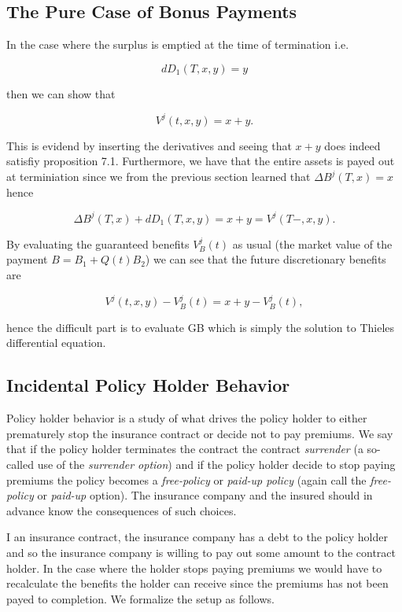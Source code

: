 \documentclass[a4paper,10pt,openany]{book}
\begin{document}
\hypertarget{the-pure-case-of-bonus-payments}{%
\subsection{The Pure Case of Bonus Payments}\label{the-pure-case-of-bonus-payments}}

In the case where the surplus is emptied at the time of termination i.e.

\[
dD_1(T,x,y)=y
\]

then we can show that

\[
V^j(t,x,y)=x+y.
\]

This is evidend by inserting the derivatives and seeing that \(x+y\) does indeed satisfiy proposition 7.1. Furthermore, we have that the entire assets is payed out at terminiation since we from the previous section learned that \(\Delta B^j(T,x)=x\) hence

\[
\Delta B^j(T,x)+dD_1(T,x,y)=x+y=V^j(T-,x,y).
\]

By evaluating the guaranteed benefits \(V_B^j(t)\) as usual (the market value of the payment \(B=B_1+Q(t)B_2\)) we can see that the future discretionary benefits are

\[
V^j(t,x,y)-V^j_B(t)=x+y-V_B^j(t),
\]

hence the difficult part is to evaluate GB which is simply the solution to Thieles differential equation.

\hypertarget{incidental-policy-holder-behavior}{%
\subsection{Incidental Policy Holder Behavior}\label{incidental-policy-holder-behavior}}

Policy holder behavior is a study of what drives the policy holder to either prematurely stop the insurance contract or decide not to pay premiums. We say that if the policy holder terminates the contract the contract \emph{surrender} (a so-called use of the \emph{surrender option}) and if the policy holder decide to stop paying premiums the policy becomes a \emph{free-policy} or \emph{paid-up policy} (again call the \emph{free-policy} or \emph{paid-up} option). The insurance company and the insured should in advance know the consequences of such choices.

I an insurance contract, the insurance company has a debt to the policy holder and so the insurance company is willing to pay out some amount to the contract holder. In the case where the holder stops paying premiums we would have to recalculate the benefits the holder can receive since the premiums has not been payed to completion. We formalize the setup as follows.
\end{document}
